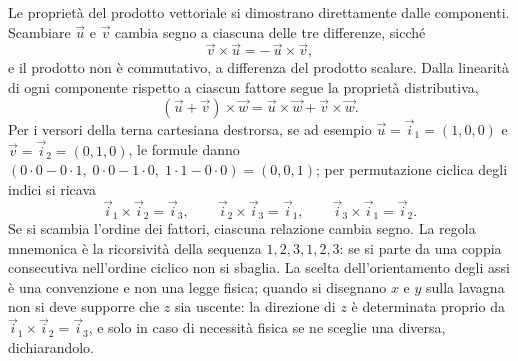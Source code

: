 \documentclass[11pt,a4paper]{article}
\begin{document}
Le proprietà del prodotto vettoriale si dimostrano direttamente dalle componenti. Scambiare $\vec u$ e $\vec v$ cambia segno a ciascuna delle tre differenze, sicché
\[
\vec v\times\vec u=-\,\vec u\times\vec v ,
\]
e il prodotto non è commutativo, a differenza del prodotto scalare. Dalla linearità di ogni componente rispetto a ciascun fattore segue la proprietà distributiva,
\[
(\vec u+\vec v)\times\vec w=\vec u\times\vec w+\vec v\times\vec w .
\]
Per i versori della terna cartesiana destrorsa, se ad esempio $\vec u=\vec i_1=(1,0,0)$ e $\vec v=\vec i_2=(0,1,0)$, le formule danno $(0\cdot0-0\cdot1,\;0\cdot0-1\cdot0,\;1\cdot1-0\cdot0)=(0,0,1)$; per permutazione ciclica degli indici si ricava
\[
\vec i_1\times\vec i_2=\vec i_3,\qquad \vec i_2\times\vec i_3=\vec i_1,\qquad \vec i_3\times\vec i_1=\vec i_2 .
\]
Se si scambia l'ordine dei fattori, ciascuna relazione cambia segno. La regola mnemonica è la ricorsività della sequenza $1,2,3,1,2,3$: se si parte da una coppia consecutiva nell'ordine ciclico non si sbaglia. La scelta dell'orientamento degli assi è una convenzione e non una legge fisica; quando si disegnano $x$ e $y$ sulla lavagna non si deve supporre che $z$ sia uscente: la direzione di $z$ è determinata proprio da $\vec i_1\times\vec i_2=\vec i_3$, e solo in caso di necessità fisica se ne sceglie una diversa, dichiarandolo.
\end{document}
